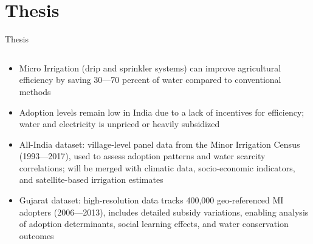 \documentclass[10pt]{beamer}
\begin{document}
\section{Thesis}
\begin{frame}{Thesis}
	\begin{columns}
		\begin{column}{0.7\textwidth}
			\begin{itemize}
				\item Micro Irrigation (drip and sprinkler systems) can improve agricultural efficiency by saving 30—70 percent of water compared to conventional methods
				\item Adoption levels remain low in India due to a lack of incentives for efficiency; water and electricity is unpriced or heavily subsidized
				\item All-India dataset: village-level panel data from the Minor Irrigation Census (1993—2017), used to assess adoption patterns and water scarcity correlations; will be merged with climatic data, socio-economic indicators, and satellite-based irrigation estimates
				\item Gujarat dataset: high-resolution data tracks 400,000 geo-referenced MI adopters (2006—2013), includes detailed subsidy variations, enabling analysis of adoption determinants, social learning effects, and water conservation outcomes
			\end{itemize}
		\end{column}


\end{columns}
\end{frame}
\end{document}
